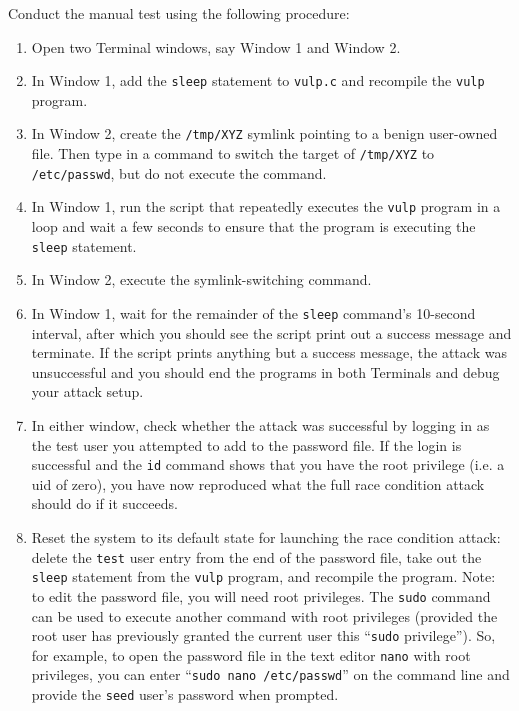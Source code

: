 Conduct the manual test using the following procedure:
\begin{enumerate}
  \item Open two Terminal windows, say Window 1 and Window 2.
  \item In Window 1, add the \texttt{sleep} statement to \texttt{vulp.c}
        and recompile the \texttt{vulp} program.  
  \item In Window 2, create the \texttt{/tmp/XYZ} symlink pointing to a
	benign user-owned file.  Then type in a command to switch the
	target of \texttt{/tmp/XYZ} to \texttt{/etc/passwd}, but do not
        execute the command.  
  \item In Window 1, run the script that repeatedly executes the
	\texttt{vulp} program in a loop and wait a few seconds to ensure
        that the program is executing the \texttt{sleep} statement.
  \item In Window 2, execute the symlink-switching command.  
  \item In Window 1, wait for the remainder of the \texttt{sleep}
	command's 10-second interval, after which you should see the
	script print out a success message and terminate.  If the script
	prints anything but a success message, the attack was
	unsuccessful and you should end the programs in both Terminals
        and debug your attack setup.  
  \item In either window, check whether the attack was successful by
	logging in as the test user you attempted to add to the password
	file.  If the login is successful and the \texttt{id}
	command shows that you have the root privilege (i.e. a uid of
	zero), you have now reproduced what the full race condition
        attack should do if it succeeds.  
  \item Reset the system to its default state for launching the race
	condition attack:   delete the \texttt{test} user entry from the
	end of the password file, take out the \texttt{sleep} statement
	from the \texttt{vulp} program, and recompile the program. Note:
	to edit the password file, you will need root privileges.  The
	\texttt{sudo} command can be used to execute another command
	with root privileges (provided the root user has previously
	granted the current user this ``\texttt{sudo} privilege'').  So,
	for example, to open the password file in the text editor
	\texttt{nano} with root privileges, you can enter 
	``\texttt{sudo nano /etc/passwd}'' on the command line and
        provide the \texttt{seed} user's password when prompted.
\end{enumerate}  



